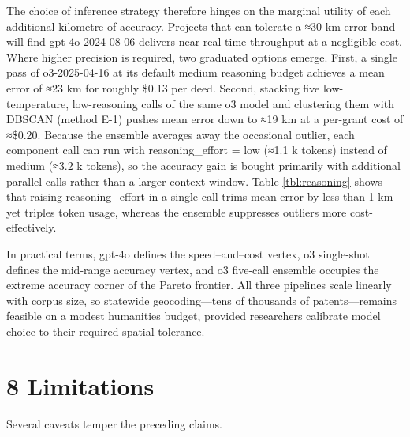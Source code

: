 \documentclass[
  10pt,
  twocolumn]{article}
\begin{document}
The choice of inference strategy therefore hinges on the marginal
utility of each additional kilometre of accuracy. Projects that can
tolerate a ≈30 km error band will find gpt-4o-2024-08-06 delivers
near-real-time throughput at a negligible cost. Where higher precision
is required, two graduated options emerge. First, a single pass of
o3-2025-04-16 at its default medium reasoning budget achieves a mean
error of ≈23 km for roughly \$0.13 per deed. Second, stacking five
low-temperature, low-reasoning calls of the same o3 model and clustering
them with DBSCAN (method E-1) pushes mean error down to ≈19 km at a
per-grant cost of ≈\$0.20. Because the ensemble averages away the
occasional outlier, each component call can run with reasoning\_effort =
low (≈1.1 k tokens) instead of medium (≈3.2 k tokens), so the accuracy
gain is bought primarily with additional parallel calls rather than a
larger context window. Table \ref{tbl:reasoning} shows that raising
reasoning\_effort in a single call trims mean error by less than 1 km
yet triples token usage, whereas the ensemble suppresses outliers more
cost-effectively.

In practical terms, gpt-4o defines the speed--and--cost vertex, o3
single-shot defines the mid-range accuracy vertex, and o3 five-call
ensemble occupies the extreme accuracy corner of the Pareto frontier.
All three pipelines scale linearly with corpus size, so statewide
geocoding---tens of thousands of patents---remains feasible on a modest
humanities budget, provided researchers calibrate model choice to their
required spatial tolerance.

\section{8 Limitations}\label{limitations}

Several caveats temper the preceding claims.
\end{document}
